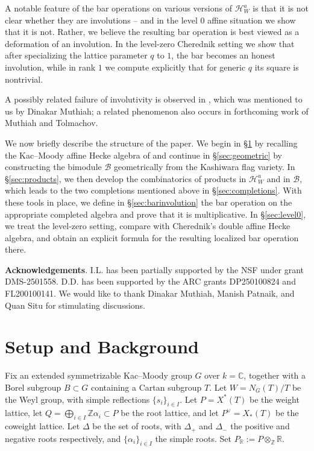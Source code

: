 \documentclass{amsart}
\newcommand{\Ha}{\mathcal{H}_{W}^a}
\newcommand{\B}{\mathcal{B}}
\theoremstyle{definition}
\numberwithin{equation}{section}
\begin{document}
{ A notable feature of the bar operations on various versions of $\mathcal{H}^a_W$ is that it is not clear whether they are involutions -- and in the level 0 affine situation we show that it is not.
Rather, we believe the resulting bar operation is best viewed as a deformation of an involution. In the level-zero Cherednik setting we show that after specializing the lattice parameter $q$ to $1$, the bar becomes an honest involution, while in rank $1$ we compute explicitly that for generic $q$ its square is nontrivial.} %

A possibly related failure of involutivity is observed in \cite{PPThesis}, which was { mentioned} to us by Dinakar Muthiah; a related phenomenon also occurs in forthcoming work of Muthiah and Tolmachov.

{ We now briefly describe the structure of the paper.}
We begin in \S \ref{sec:setup} by recalling the Kac--Moody affine Hecke algebra of \cite{GG} and continue in \S \ref{sec:geometric} by constructing the bimodule $\B$ geometrically from the Kashiwara flag variety. In \S \ref{sec:products}, we then develop the combinatorics of products in $\Ha$ and in $\B$, which leads to the two completions mentioned above {in \S\ref{sec:completions}}. With these tools in place, we define in \S \ref{sec:barinvolution} the bar operation on the appropriate completed algebra and prove that it is multiplicative. In \S \ref{sec:level0}, we treat the level-zero setting, compare with Cherednik's double affine Hecke algebra, and obtain an explicit formula for the resulting localized bar operation there.

{ {\bf Acknowledgements}. I.L. has been partially supported by the NSF under grant DMS-2501558. D.D. has been supported by the ARC grants DP250100824 and FL200100141. We would like to thank Dinakar Muthiah, Manish Patnaik, and Quan Situ for stimulating discussions.}

\section{Setup and Background}\label{sec:setup}\label{sec:kacmoodysetup}

Fix an extended symmetrizable Kac--Moody group $G$ over $k = \mathbb{C}$,
together with a Borel subgroup $B \subset G$ containing a Cartan subgroup $T$. Let $W=N_G(T)/T$ be the Weyl group, with simple reflections $\{s_i\}_{i\in I}$.
Let $P = X^*(T)$ be the weight lattice, let $Q=\bigoplus_{i\in I}\mathbb Z\alpha_i\subset P$
be the root lattice, and let $P^\vee=X_*(T)$ be the coweight lattice. Let $\Delta$
be the set of roots, with $\Delta_+$ and $\Delta_-$ the positive and negative roots
respectively, and $\{\alpha_i\}_{i \in I}$ the simple roots.
Set \(P_{\mathbb R}:=P\otimes_{\mathbb Z}\mathbb R\).
\end{document}

